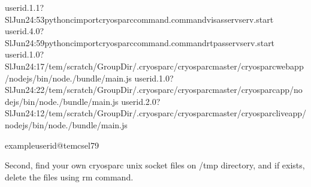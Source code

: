 \documentclass[a4paper,11pt,english]{sphinxmanual}
\begin{document}
\begin{sphinxVerbatim}[commandchars=\\\{\}]
userid.1.1?SlJun24:53python\PYGZhy{}cimportcryosparc\PYGZus{}command.command\PYGZus{}visasservserv.start
userid.4.0?SlJun24:59python\PYGZhy{}cimportcryosparc\PYGZus{}command.command\PYGZus{}rtpasservserv.start
userid.1.0?SlJun24:17/tem/scratch/\PYGZlt{}GroupDir\PYGZgt{}/.cryosparc/cryosparc\PYGZus{}master/cryosparc\PYGZus{}webapp/nodejs/bin/node./bundle/main.js
userid.1.0?SlJun24:22/tem/scratch/\PYGZlt{}GroupDir\PYGZgt{}/.cryosparc/cryosparc\PYGZus{}master/cryosparc\PYGZus{}app/nodejs/bin/node./bundle/main.js
userid.2.0?SlJun24:12/tem/scratch/\PYGZlt{}GroupDir\PYGZgt{}/.cryosparc/cryosparc\PYGZus{}master/cryosparc\PYGZus{}liveapp/nodejs/bin/node./bundle/main.js

exampleuserid@tem\PYGZhy{}cs\PYGZhy{}el7\PYGZdl{}\PYGZgt{}\PYGZhy{}9
\end{sphinxVerbatim}

\sphinxAtStartPar
Second, find your own cryosparc unix socket files on /tmp directory, and if exists, delete the files using rm command.
\end{document}
